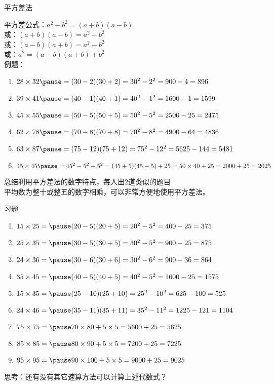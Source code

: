 \documentclass[aspectratio=169]{ctexbeamer} %
\date{\today}
\begin{document}
\begin{frame}[t]{平方差法}
\begin{spacing}{1.2}
\normalsize
平方差公式：$a^2 - b^2 = (a+b)(a-b)$ \\
或：$(a+b)(a-b)=a^2 - b^2$ \\
或：$(a-b)(a+b)=a^2 - b^2$ \\
或：$a^2 = (a-b)(a+b) + b^2$ \\
例题：
\begin{enumerate}[label={\arabic*.}]
\item $28 \times 32 \pause = (30-2)(30+2)=30^2-2^2=900-4=896$
\item $39 \times 41 \pause = (40-1)(40+1)=40^2-1^2=1600-1=1599$
\item $45 \times 55 \pause = (50-5)(50+5)=50^2-5^2=2500-25=2475$
\item $62 \times 78 \pause = (70-8)(70+8)=70^2-8^2=4900-64=4836$
\item $63 \times 87 \pause = (75-12)(75+12)=75^2-12^2=5625-144=5481$
\item $45 \times 45 \pause = 45^2 - 5^2 + 5^2 = (45+5)(45-5) + 25 =50 \times 40 + 25=2000 + 25 = 2025$
\end{enumerate}
\alert{总结利用平方差法的数字特点，每人出2道类似的题目} \\
\pause
平均数为整十或整五的数字相乘，可以非常方便地使用平方差法。
\end{spacing}
\end{frame}

\begin{frame}[t]{习题}
\begin{spacing}{1.2}
\normalsize
\begin{enumerate}[label={\arabic*.}]
\item $15 \times 25 = \pause (20-5)(20+5) = 20^2-5^2 = 400-25 = 375$
\item $25 \times 35 = \pause (30-5)(30+5) = 30^2-5^2 = 900-25 = 875$
\item $24 \times 36 = \pause (30-6)(30+6) = 30^2-6^2 = 900-36 = 864$
\item $35 \times 45 = \pause (40-5)(40+5) = 40^2-5^2 = 1600-25 = 1575$
\item $15 \times 35 = \pause (25-10)(25+10) = 25^2-10^2 = 625-100 = 525$
\item $24 \times 46 = \pause (35-11)(35+11) = 35^2-11^2 = 1225-121 = 1104$
\item $75 \times 75 = \pause 70 \times 80 + 5 \times 5 = 5600 + 25 = 5625$
\item $85 \times 85 = \pause 80 \times 90 + 5 \times 5 = 7200 + 25 = 7225$
\item $95 \times 95 = \pause 90 \times 100 + 5 \times 5 = 9000 + 25 = 9025$
\end{enumerate}
\alert{思考：还有没有其它速算方法可以计算上述代数式？}
\end{spacing}
\end{frame}
\end{document}
